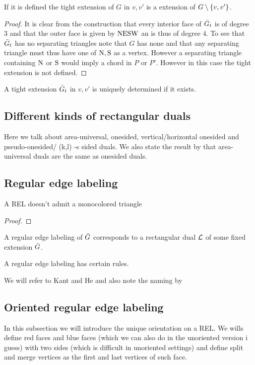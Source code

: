 \begin{lemma}
  If it is defined the tight extension of $G$ in $v, v'$ is a extension of $G \setminus \left\lbrace {v, v'} \right\rbrace$.
\end{lemma}
\begin{proof}
  It is clear from the construction that every interior face of $\bar{G}_t$ is of degree 3 and that the outer face is given by $\mathrm{N} \mathrm{E} \mathrm{S} \mathrm{W}$ an is thus of degree $4$.
  To see that $\bar{G}_t$ has no separating triangles note that $G$ has none and that any separating triangle must thus have one of $\mathrm{N}, \mathrm{S}$ as a vertex. However a separating triangle containing $\mathrm{N}$ or $\mathrm{S}$ would imply a chord in $P$ or $P'$. However in this case the tight extension is not defined.
\end{proof}

A tight extension $\bar{G}_t$ in $v , v'$ is uniquely determined if it exists.

\subsection{Different kinds of rectangular duals}
Here we talk about area-universal, onesided, vertical/horizontal onesided and pseudo-onesided/ (k,l) -s sided duals.
We also state the result by \cite{Eppstein2012} that area-universal duals are the same as onesided duals.


\subsection{Regular edge labeling}


\begin{lemma}
  \label{lm:rel:noMonoColoredTriangles}
  A REL doesn't admit a monocolored triangle
\end{lemma}

\begin{proof}
\end{proof}

A regular edge labeling  of $\bar{G}$ corresponds to a rectangular dual $\mathcal{L}$ of some fixed extension $\bar{G}$.

A regular edge labeling has certain rules.

We will refer to Kant and He \cite{Kant1997} and also note the naming by \cite{Fusy2006}


\subsection{Oriented regular edge labeling}
In this subsection we will introduce the unique orientation on a REL. We wills define red faces and blue faces (which we can also do in the unoriented version i guess) with two sides (which is difficult in unoriented settings) and define split and merge vertices as the first and last vertices of such face.

